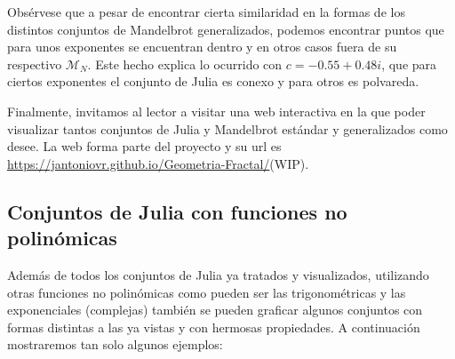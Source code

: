 Obsérvese que a pesar de encontrar cierta similaridad en la formas de los distintos conjuntos de Mandelbrot generalizados, podemos encontrar puntos que para unos exponentes se encuentran dentro y en otros casos fuera de su respectivo $\mathcal{M}_N$. Este hecho explica lo ocurrido con $c=-0.55+0.48i$, que para ciertos exponentes el conjunto de Julia es conexo y para otros es polvareda.

Finalmente, invitamos al lector a visitar una web interactiva en la que poder visualizar tantos conjuntos de Julia y Mandelbrot estándar y generalizados como desee. La web forma parte del proyecto y su url es \url{https://jantoniovr.github.io/Geometria-Fractal/}(WIP).%

\subsection{Conjuntos de Julia con funciones no polinómicas}

Además de todos los conjuntos de Julia ya tratados y visualizados, utilizando otras funciones no polinómicas como pueden ser las trigonométricas y las exponenciales (complejas) también se pueden graficar algunos conjuntos con formas distintas a las ya vistas y con hermosas propiedades. A continuación mostraremos tan solo algunos ejemplos:

